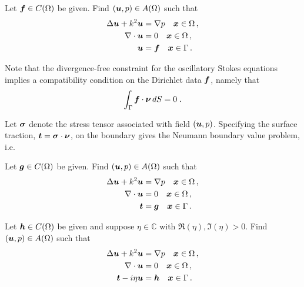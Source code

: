\begin{definition}
  Let ${\boldsymbol f} \in C(\Omega)$ be given. Find $({\boldsymbol u},p) \in A(\Omega)$
  such that
  \begin{equation}
  \begin{aligned} \label{eq:dir_interior}
    \Delta {\boldsymbol u} + k^{2} {\boldsymbol u} &= \nabla p \quad {\boldsymbol x} \in \Omega \, ,\\
    \nabla \cdot {\boldsymbol u} &= 0 \quad {\boldsymbol x} \in \Omega \, ,  \\
    {\boldsymbol u} &= {\boldsymbol f} \quad {\boldsymbol x} \in \Gamma \, .
  \end{aligned}
  \end{equation}
\end{definition}
Note that the divergence-free constraint for the oscillatory
Stokes equations implies a compatibility condition on the
Dirichlet data ${\boldsymbol f}$, namely that
\begin{equation} \label{eq:dir_compat}
  \int_\Gamma {\boldsymbol f} \cdot {\boldsymbol \nu} \, dS = 0 \; .
\end{equation}


Let ${\boldsymbol \sigma}$ denote the stress tensor associated with
field $({\boldsymbol u},p)$. 
Specifying the surface traction, ${\boldsymbol t} = {\boldsymbol \sigma} \cdot {\boldsymbol \nu}$,
on the boundary gives the Neumann boundary value
problem, i.e.

\begin{definition}
  Let ${\boldsymbol g} \in C(\Omega)$ be given. Find $({\boldsymbol u},p) \in A(\Omega)$
  such that
  \begin{equation}
  \begin{aligned} \label{eq:neu_interior}
    \Delta {\boldsymbol u} + k^{2} {\boldsymbol u} &= \nabla p \quad {\boldsymbol x} \in \Omega \, ,\\
    \nabla \cdot {\boldsymbol u} &= 0 \quad {\boldsymbol x} \in \Omega \, ,  \\
    {\boldsymbol t} &= {\boldsymbol g} \quad {\boldsymbol x} \in \Gamma \, .
  \end{aligned}
  \end{equation}
\end{definition}

\begin{definition}
  Let ${\boldsymbol h} \in C(\Omega)$ be given and suppose 
  $\eta \in \mathbb{C}$ with $\Re{(\eta)},\Im{(\eta)}>0$. 
  Find $({\boldsymbol u},p) \in A(\Omega)$  such that
  \begin{equation}
  \begin{aligned} \label{eq:neu_interior}
    \Delta {\boldsymbol u} + k^{2} {\boldsymbol u} &= \nabla p \quad {\boldsymbol x} \in \Omega \, ,\\
    \nabla \cdot {\boldsymbol u} &= 0 \quad {\boldsymbol x} \in \Omega \, ,  \\
    {\boldsymbol t} - i \eta {\boldsymbol u} &= {\boldsymbol h} \quad {\boldsymbol x} \in \Gamma \, .
  \end{aligned}
  \end{equation}
\end{definition}


